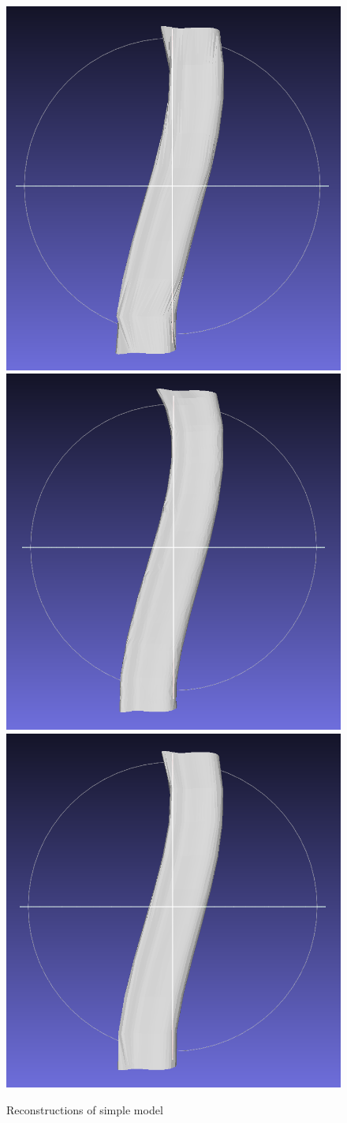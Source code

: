 \documentclass[11p, titlepage]{article}
\begin{document}
\begin{figure}[h]
\begin{minipage}[b]{.6\linewidth}
       \hfill
       {\includegraphics[width=.48\linewidth]{reconstructions/dtw-simple-10}}
       \hfill
       {\includegraphics[width=.48\linewidth]{reconstructions/cspa50-simple-50}}%
       \hfill
       {\includegraphics[width=.48\linewidth]{reconstructions/cspa50-simple-10}}
     \end{minipage}%
        \caption{Reconstructions of simple model}
        \label{fig:simple_reconstructions}
\end{figure}
\end{document}
